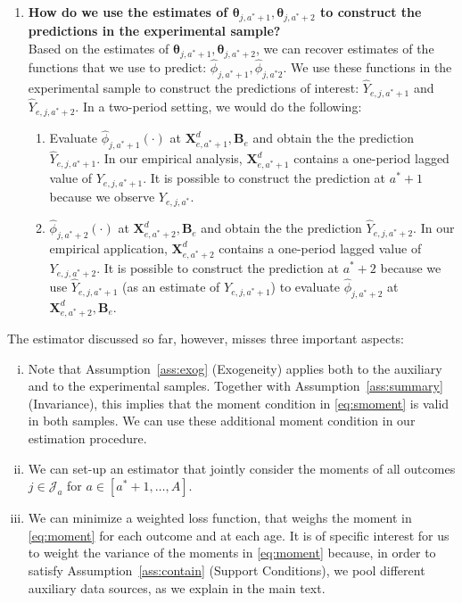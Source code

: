 \begin{enumerate}
\item \textbf{How do we use the estimates of $\bm{\theta}_{j,a^*+1}, \bm{\theta}_{j,a^*+2}$ to construct the predictions in the experimental sample?}\\ 
\noindent Based on the estimates of $\bm{\theta}_{j,a^*+1}, \bm{\theta}_{j,a^*+2}$, we can recover estimates of the functions that we use to predict: $\hat{\phi}_{j,a^*+1}, \hat{\phi}_{j,a^*2}$. We use these functions in the experimental sample to construct the predictions of interest: $\hat{Y}_{e,j,a^*+1}$ and $\hat{Y}_{e,j,a^*+2}$. In a two-period setting, we would do the following: 

\begin{enumerate}
\item Evaluate $\hat{\phi}_{j,a^*+1} \left( \cdot \right)$ at  $\bm{X}_{e,a^*+1}^d, \bm{B}_{e}$ and obtain the the prediction $\hat{Y}_{e,j,a^*+1}$. In our empirical analysis, $\bm{X}_{e,a^*+1}^d$ contains a one-period lagged value of $Y_{e,j,a^*+1}$. It is possible to construct the prediction at $a^*+1$ because we observe $Y_{e,j,a^*}$.

\item $\hat{\phi}_{j,a^*+2} \left( \cdot \right)$ at  $\bm{X}_{e,a^*+2}^d, \bm{B}_{e}$ and obtain the the prediction $\hat{Y}_{e,j,a^*+2}$. In our empirical application, $\bm{X}_{e,a^*+2}^d$ contains a one-period lagged value of $Y_{e,j,a^*+2}$. It is possible to construct the prediction at $a^*+2$ because we use $\hat{Y}_{e,j,a^*+1}$ (as an estimate of $Y_{e,j,a^*+1}$) to evaluate $\hat{\phi}_{j,a^*+2}$ at  $\bm{X}_{e,a^*+2}^d, \bm{B}_{e}$.
\end{enumerate}
\end{enumerate}

\noindent \noindent The estimator discussed so far, however, misses three important aspects: 

\begin{enumerate}[(i)] 
\item Note that Assumption~\ref{ass:exog} (Exogeneity) applies both to the auxiliary and to the experimental samples. Together with Assumption~\ref{ass:summary} (Invariance), this implies that the moment condition in \eqref{eq:smoment} is valid in both samples. We can use these additional moment condition in our estimation procedure.
\item We can set-up an estimator that jointly consider the moments of all outcomes $j \in \mathcal{J}_{a}$ for $a \in [a^*+1, \ldots, A]$.
\item We can minimize a weighted loss function, that weighs the moment in \eqref{eq:moment} for each outcome and at each age. It is of specific interest for us to weight the variance of the moments in \eqref{eq:moment} because, in order to satisfy Assumption~\ref{ass:contain} (Support Conditions), we pool different auxiliary data sources, as we explain in the main text.
\end{enumerate}

